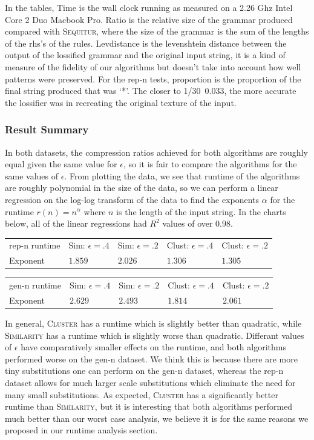 \documentclass[11pt]{article}
\newcommand{\Sequitur}{\textsc{Sequitur}\xspace}
\newcommand{\Similarity}{\textsc{Similarity}\xspace}
\newcommand{\Cluster}{\textsc{Cluster}\xspace}
\begin{document}
In the tables, Time is the
wall clock running as measured on a 2.26 Ghz Intel Core 2 Duo Macbook Pro.
Ratio is the relative size of the grammar produced compared with \Sequitur,
where the size of the grammar is the sum of the lengths of the rhs's of the
rules. Levdistance is the levenshtein distance between the output of the
lossified grammar and the original input string, it is a kind of measure of the
fidelity of our algorithms but doesn't take into account how well patterns were
preserved. For the rep-n tests, proportion is the proportion of the final
string produced that was `*'. The closer to 1/30~0.033, the more accurate the
lossifier was in recreating the original texture of the input.

\subsubsection{Result Summary}

In both datasets, the
compression ratios achieved for both algorithms are roughly equal given the
same value for $\epsilon$, so it is fair to compare the algorithms for the same
values of $\epsilon$.
From plotting the data, we see that runtime of the algorithms are roughly
polynomial in the size of the data, so we can perform a linear regression on
the log-log transform of the data to find the exponents $\alpha$ for the
runtime $r(n)=n^\alpha$ where $n$ is the length of the input string. In the
charts below, all of the linear regressions had $R^2$ values of over $0.98$.

\begin{tabular}{l|l|l|l|l}
rep-n runtime & Sim: $\epsilon=.4$ & Sim: $\epsilon=.2$ & Clust: $\epsilon = .4$ & Clust: $\epsilon = .2$ \\
Exponent      & $1.859$ & $2.026$ & $1.306$ & $1.305$
\end{tabular}

\begin{tabular}{l|l|l|l|l}
gen-n runtime & Sim: $\epsilon=.4$ & Sim: $\epsilon=.2$ & Clust: $\epsilon = .4$ & Clust: $\epsilon = .2$ \\
Exponent      & $2.629$ & $2.493$ & $1.814$ & $2.061$
\end{tabular}

In general, \Cluster has a runtime which is slightly better than quadratic,
while \Similarity has a runtime which is slightly worse than quadratic.
Differant values of $\epsilon$ have comparatively smaller effects on the
runtime, and both algorithms performed worse on the gen-n dataset. We think
this is because there are more tiny substitutions one can perform on
the gen-n dataset, whereas the rep-n dataset allows for much larger scale
substitutions which eliminate the need for many small substitutions.
As expected, \Cluster has a significantly better runtime than \Similarity,
but it is interesting that both algorithms performed much better than our
worst case analysis, we believe it is for the same reasons we proposed
in our runtime analysis section.
\end{document}
